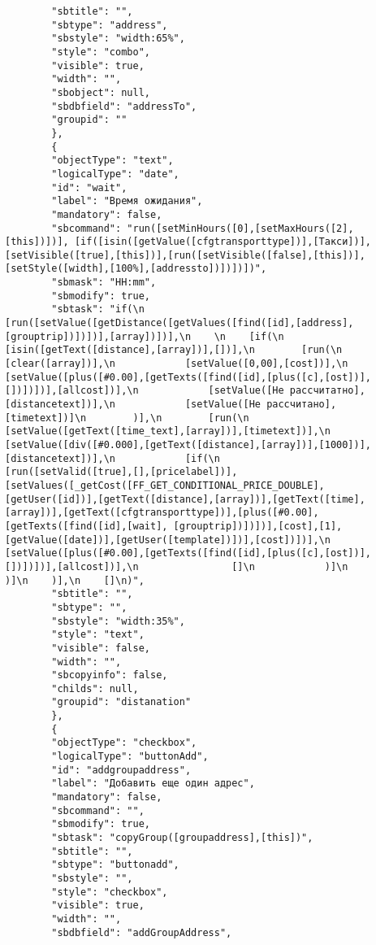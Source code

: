 \documentclass[../index.tex]{subfiles}
\begin{document}
\begin{verbatim}
        "sbtitle": "",
        "sbtype": "address",
        "sbstyle": "width:65%",
        "style": "combo",
        "visible": true,
        "width": "",
        "sbobject": null,
        "sbdbfield": "addressTo",
        "groupid": ""
        },
        {
        "objectType": "text",
        "logicalType": "date",
        "id": "wait",
        "label": "Время ожидания",
        "mandatory": false,
        "sbcommand": "run([setMinHours([0],[setMaxHours([2],[this])])], [if([isin([getValue([cfgtransporttype])],[Такси])],[setVisible([true],[this])],[run([setVisible([false],[this])],[setStyle([width],[100%],[addressto])])])])",
        "sbmask": "HH:mm",
        "sbmodify": true,
        "sbtask": "if(\n    [run([setValue([getDistance([getValues([find([id],[address],[grouptrip])])])],[array])])],\n    \n    [if(\n        [isin([getText([distance],[array])],[])],\n        [run(\n            [clear([array])],\n            [setValue([0,00],[cost])],\n            [setValue([plus([#0.00],[getTexts([find([id],[plus([c],[ost])],[])])])],[allcost])],\n            [setValue([Не рассчитатно],[distancetext])],\n            [setValue([Не рассчитано],[timetext])]\n        )],\n        [run(\n            [setValue([getText([time_text],[array])],[timetext])],\n            [setValue([div([#0.000],[getText([distance],[array])],[1000])],[distancetext])],\n            [if(\n                [run([setValid([true],[],[pricelabel])],[setValues([_getCost([FF_GET_CONDITIONAL_PRICE_DOUBLE],[getUser([id])],[getText([distance],[array])],[getText([time],[array])],[getText([cfgtransporttype])],[plus([#0.00],[getTexts([find([id],[wait], [grouptrip])])])],[cost],[1],[getValue([date])],[getUser([template])])],[cost])])],\n                [setValue([plus([#0.00],[getTexts([find([id],[plus([c],[ost])],[])])])],[allcost])],\n                []\n            )]\n        )]\n    )],\n    []\n)",
        "sbtitle": "",
        "sbtype": "",
        "sbstyle": "width:35%",
        "style": "text",
        "visible": false,
        "width": "",
        "sbcopyinfo": false,
        "childs": null,
        "groupid": "distanation"
        },
        {
        "objectType": "checkbox",
        "logicalType": "buttonAdd",
        "id": "addgroupaddress",
        "label": "Добавить еще один адрес",
        "mandatory": false,
        "sbcommand": "",
        "sbmodify": true,
        "sbtask": "copyGroup([groupaddress],[this])",
        "sbtitle": "",
        "sbtype": "buttonadd",
        "sbstyle": "",
        "style": "checkbox",
        "visible": true,
        "width": "",
        "sbdbfield": "addGroupAddress",

\end{verbatim}
\end{document}

